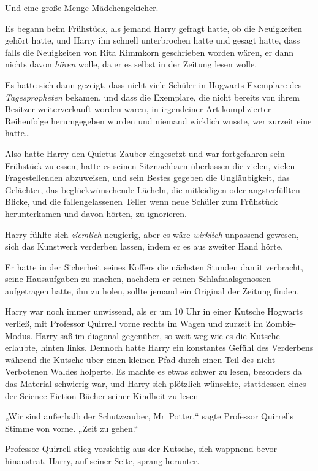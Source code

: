 {Und eine große Menge Mädchengekicher.

Es begann beim Frühstück, als jemand Harry gefragt hatte, ob die Neuigkeiten gehört hatte, und Harry ihn schnell unterbrochen hatte und gesagt hatte, dass falls die Neuigkeiten von Rita Kimmkorn geschrieben worden wären, er dann nichts davon \emph{hören} wolle, da er es selbst in der Zeitung lesen wolle.

Es hatte sich dann gezeigt, dass nicht viele Schüler in Hogwarts Exemplare des \emph{Tagespropheten} bekamen, und dass die Exemplare, die nicht bereits von ihrem Besitzer weiterverkauft worden waren, in irgendeiner Art komplizierter Reihenfolge herumgegeben wurden und niemand wirklich wusste, wer zurzeit eine hatte…

Also hatte Harry den Quietus-Zauber eingesetzt und war fortgefahren sein Frühstück zu essen, hatte es seinen Sitznachbarn überlassen die vielen, vielen Fragestellenden abzuweisen, und sein Bestes gegeben die Ungläubigkeit, das Gelächter, das beglückwünschende Lächeln, die mitleidigen oder angsterfüllten Blicke, und die fallengelassenen Teller wenn neue Schüler zum Frühstück herunterkamen und davon hörten, zu ignorieren.

Harry fühlte sich \emph{ziemlich} neugierig, aber es wäre \emph{wirklich} unpassend gewesen, sich das Kunstwerk verderben lassen, indem er es aus zweiter Hand hörte.

Er hatte in der Sicherheit seines Koffers die nächsten Stunden damit verbracht, seine Hausaufgaben zu machen, nachdem er seinen Schlafsaalsgenossen aufgetragen hatte, ihn zu holen, sollte jemand ein Original der Zeitung finden.

Harry war noch immer unwissend, als er um 10 Uhr in einer Kutsche Hogwarts verließ, mit Professor Quirrell vorne rechts im Wagen und zurzeit im Zombie-Modus. Harry saß im diagonal gegenüber, so weit weg wie es die Kutsche erlaubte, hinten links. Dennoch hatte Harry ein konstantes Gefühl des Verderbens während die Kutsche über einen kleinen Pfad durch einen Teil des nicht-Verbotenen Waldes holperte. Es machte es etwas schwer zu lesen, besonders da das Material schwierig war, und Harry sich plötzlich wünschte, stattdessen eines der Science-Fiction-Bücher seiner Kindheit zu lesen \later

„Wir sind außerhalb der Schutzzauber, Mr~Potter,“ sagte Professor Quirrells Stimme von vorne. „Zeit zu gehen.“

Professor Quirrell stieg vorsichtig aus der Kutsche, sich wappnend bevor hinaustrat. Harry, auf seiner Seite, sprang herunter.

}
